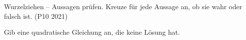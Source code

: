 \begin{aufgabe}{Wurzelziehen -- Aussagen prüfen. Kreuze für jede Aussage an, ob sie
wahr oder falsch ist. \hfill (P10 2021)}


\begin{teile}
\setcounter{teil}{2}
\teil Gib eine quadratische Gleichung an, die keine Lösung hat. \hfill \leerfeld
\end{teile}
\end{aufgabe}
